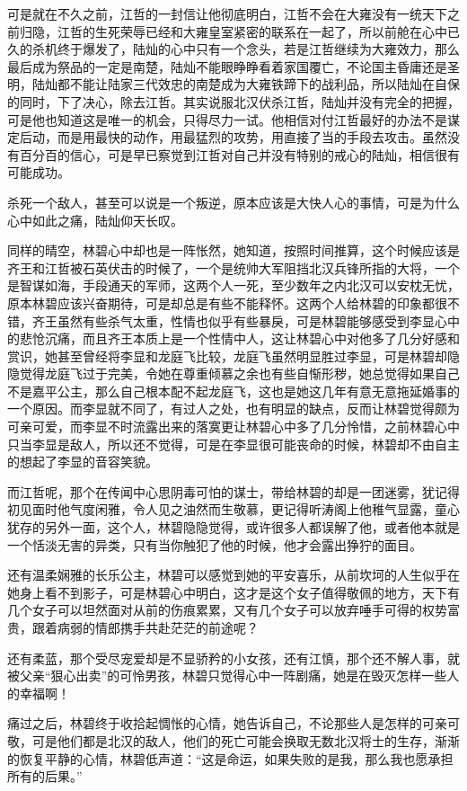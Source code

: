可是就在不久之前，江哲的一封信让他彻底明白，江哲不会在大雍没有一统天下之前归隐，江哲的生死荣辱已经和大雍皇室紧密的联系在一起了，所以前舱在心中已久的杀机终于爆发了，陆灿的心中只有一个念头，若是江哲继续为大雍效力，那么最后成为祭品的一定是南楚，陆灿不能眼睁睁看着家国覆亡，不论国主昏庸还是圣明，陆灿都不能让陆家三代效忠的南楚成为大雍铁蹄下的战利品，所以陆灿在自保的同时，下了决心，除去江哲。其实说服北汉伏杀江哲，陆灿并没有完全的把握，可是他也知道这是唯一的机会，只得尽力一试。他相信对付江哲最好的办法不是谋定后动，而是用最快的动作，用最猛烈的攻势，用直接了当的手段去攻击。虽然没有百分百的信心，可是早已察觉到江哲对自己并没有特别的戒心的陆灿，相信很有可能成功。

杀死一个敌人，甚至可以说是一个叛逆，原本应该是大快人心的事情，可是为什么心中如此之痛，陆灿仰天长叹。

同样的晴空，林碧心中却也是一阵怅然，她知道，按照时间推算，这个时候应该是齐王和江哲被石英伏击的时候了，一个是统帅大军阻挡北汉兵锋所指的大将，一个是智谋如海，手段通天的军师，这两个人一死，至少数年之内北汉可以安枕无忧，原本林碧应该兴奋期待，可是却总是有些不能释怀。这两个人给林碧的印象都很不错，齐王虽然有些杀气太重，性情也似乎有些暴戾，可是林碧能够感受到李显心中的悲怆沉痛，而且齐王本质上是一个性情中人，这让林碧心中对他多了几分好感和赏识，她甚至曾经将李显和龙庭飞比较，龙庭飞虽然明显胜过李显，可是林碧却隐隐觉得龙庭飞过于完美，令她在尊重倾慕之余也有些自惭形秽，她总觉得如果自己不是嘉平公主，那么自己根本配不起龙庭飞，这也是她这几年有意无意拖延婚事的一个原因。而李显就不同了，有过人之处，也有明显的缺点，反而让林碧觉得颇为可亲可爱，而李显不时流露出来的落寞更让林碧心中多了几分怜惜，之前林碧心中只当李显是敌人，所以还不觉得，可是在李显很可能丧命的时候，林碧却不由自主的想起了李显的音容笑貌。

而江哲呢，那个在传闻中心思阴毒可怕的谋士，带给林碧的却是一团迷雾，犹记得初见面时他气度闲雅，令人见之油然而生敬慕，更记得听涛阁上他稚气显露，童心犹存的另外一面，这个人，林碧隐隐觉得，或许很多人都误解了他，或者他本就是一个恬淡无害的异类，只有当你触犯了他的时候，他才会露出狰狞的面目。

还有温柔娴雅的长乐公主，林碧可以感觉到她的平安喜乐，从前坎坷的人生似乎在她身上看不到影子，可是林碧心中明白，这才是这个女子值得敬佩的地方，天下有几个女子可以坦然面对从前的伤痕累累，又有几个女子可以放弃唾手可得的权势富贵，跟着病弱的情郎携手共赴茫茫的前途呢？

还有柔蓝，那个受尽宠爱却是不显骄矜的小女孩，还有江慎，那个还不解人事，就被父亲“狠心出卖”的可怜男孩，林碧只觉得心中一阵剧痛，她是在毁灭怎样一些人的幸福啊！

痛过之后，林碧终于收拾起惆怅的心情，她告诉自己，不论那些人是怎样的可亲可敬，可是他们都是北汉的敌人，他们的死亡可能会换取无数北汉将士的生存，渐渐的恢复平静的心情，林碧低声道：“这是命运，如果失败的是我，那么我也愿承担所有的后果。”

